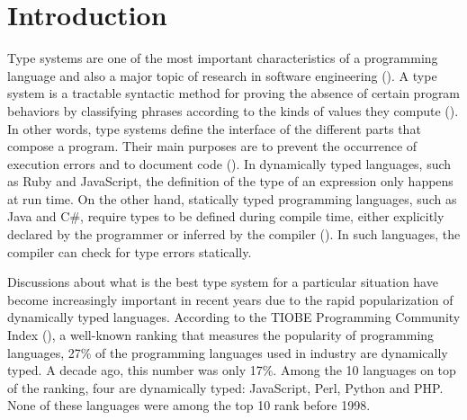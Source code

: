 \documentclass[msc]{ppgccufmg}
\begin{document}





\newcommand{\dummytxt}{\dummytxta\dummytxtb\dummytxtc}

\chapter{Introduction}

Type systems are one of the most important characteristics of a programming language and also a major topic of research in software engineering (\cite{Furr09,takikawa12,gradual_typing}).
A type system is a tractable syntactic method for proving the absence of certain program behaviors by classifying phrases according to the kinds of values they compute (\cite{types_and_programming_languages}).
In other words, type systems define the interface of the different parts that compose a program.
Their main purposes are to prevent the occurrence of execution errors and to document code (\cite{type_systems}).
In dynamically typed languages, such as Ruby and JavaScript, the definition of the type of an expression only happens at run time.
On the other hand, statically typed programming languages, such as Java and C\#, require types to be defined during compile time, either explicitly declared by the programmer or inferred by the compiler (\cite{Milner78}).
In such languages, the compiler can check for type errors statically.

Discussions about what is the best type system for a particular situation have become increasingly important in recent years due to the rapid popularization of dynamically typed languages. 
According to the TIOBE Programming Community Index (\cite{tiobe}), a well-known ranking that measures the popularity of programming languages, 27\% of the programming languages used in industry are dynamically typed. 
A decade ago, this number was only 17\%. 
Among the 10 languages on top of the ranking, four are dynamically typed: JavaScript, Perl, Python and PHP. 
None of these languages were among the top 10 rank before 1998.
\end{document}
